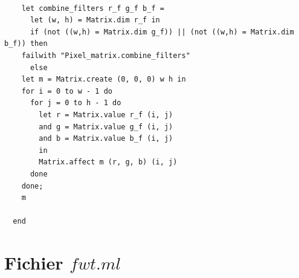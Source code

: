 \documentclass[a4paper,10pt]{report}
\theoremstyle{break}
\begin{document}
\newpage
    \begin{lstlisting}

    let combine_filters r_f g_f b_f =
      let (w, h) = Matrix.dim r_f in
      if (not ((w,h) = Matrix.dim g_f)) || (not ((w,h) = Matrix.dim b_f)) then 
	failwith "Pixel_matrix.combine_filters"
      else
	let m = Matrix.create (0, 0, 0) w h in
	for i = 0 to w - 1 do
	  for j = 0 to h - 1 do
	    let r = Matrix.value r_f (i, j)
	    and g = Matrix.value g_f (i, j)
	    and b = Matrix.value b_f (i, j)
	    in
	    Matrix.affect m (r, g, b) (i, j)
	  done
	done;
	m

  end
    \end{lstlisting}

  \section*{Fichier $fwt.ml$}
\end{document}
